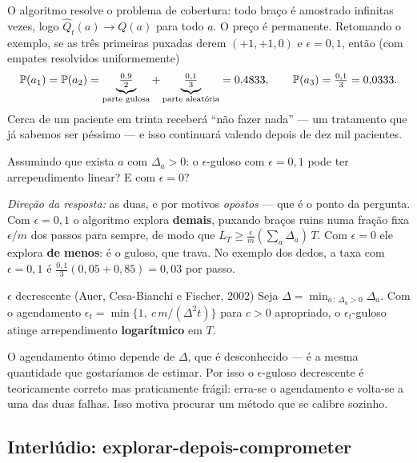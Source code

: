 \documentclass[11pt, a4paper]{article}
\newcommand{\Qhat}{\widehat{Q}}
\newcommand{\gap}{\Delta}
\newcommand{\Reg}{L}
\begin{document}
O algoritmo resolve o problema de cobertura: todo braço é amostrado
infinitas vezes, logo $\Qhat_t(a) \to Q(a)$ para todo $a$. O preço é
permanente. Retomando o exemplo, se as três primeiras puxadas derem
$(+1, +1, 0)$ e $\epsilon = 0{,}1$, então (com empates resolvidos
uniformemente)
\[
  \mathbb{P}(a_1) = \mathbb{P}(a_2) = \underbrace{\tfrac{0{,}9}{2}}_{\text{parte gulosa}}
    + \underbrace{\tfrac{0{,}1}{3}}_{\text{parte aleatória}} = 0{,}4833,
  \qquad
  \mathbb{P}(a_3) = \tfrac{0{,}1}{3} = 0{,}0333.
\]
Cerca de um paciente em trinta receberá ``não fazer nada'' — um tratamento
que já sabemos ser péssimo — e isso continuará valendo depois de dez mil
pacientes.

\begin{discbox}
Assumindo que exista $a$ com $\gap_a > 0$: o $\epsilon$-guloso com
$\epsilon = 0{,}1$ pode ter arrependimento linear? E com $\epsilon = 0$?

\smallskip
\emph{Direção da resposta:} as duas, e por motivos \emph{opostos} — que é o
ponto da pergunta. Com $\epsilon = 0{,}1$ o algoritmo explora \textbf{demais},
puxando braços ruins numa fração fixa $\epsilon/m$ dos passos para sempre, de
modo que $\Reg_T \ge \frac{\epsilon}{m}(\sum_a \gap_a)\,T$. Com $\epsilon = 0$
ele explora \textbf{de menos}: é o guloso, que trava. No exemplo dos dedos, a
taxa com $\epsilon = 0{,}1$ é $\frac{0{,}1}{3}(0{,}05 + 0{,}85) = 0{,}03$ por
passo.
\end{discbox}

\begin{teobox}{$\epsilon$ decrescente (Auer, Cesa-Bianchi e Fischer, 2002)}
Seja $\gap = \min_{a\,:\,\gap_a>0} \gap_a$. Com o agendamento
$\epsilon_t = \min\{1,\ c\,m/(\gap^2 t)\}$ para $c > 0$ apropriado, o
$\epsilon_t$-guloso atinge arrependimento \textbf{logarítmico} em $T$.
\end{teobox}

\begin{alertabox}
O agendamento ótimo depende de $\gap$, que é desconhecido — é a mesma
quantidade que gostaríamos de estimar. Por isso o $\epsilon$-guloso
decrescente é teoricamente correto mas praticamente frágil: erra-se o
agendamento e volta-se a uma das duas falhas. Isso motiva procurar um método
que se calibre sozinho.
\end{alertabox}

\subsection*{Interlúdio: explorar-depois-comprometer}
\end{document}
